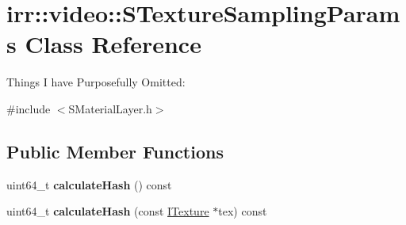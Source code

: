 \hypertarget{classirr_1_1video_1_1STextureSamplingParams}{}\section{irr\+:\+:video\+:\+:S\+Texture\+Sampling\+Params Class Reference}
\label{classirr_1_1video_1_1STextureSamplingParams}


Things I have Purposefully Omitted\+:  




{\ttfamily \#include $<$S\+Material\+Layer.\+h$>$}

\subsection*{Public Member Functions}
\begin{DoxyCompactItemize}
\item 
uint64\+\_\+t {\bfseries calculate\+Hash} () const \hypertarget{classirr_1_1video_1_1STextureSamplingParams_addbba653a10412ca9eb7f40dd8938d7f}{}\label{classirr_1_1video_1_1STextureSamplingParams_addbba653a10412ca9eb7f40dd8938d7f}

\item 
uint64\+\_\+t {\bfseries calculate\+Hash} (const \hyperlink{classirr_1_1video_1_1ITexture}{I\+Texture} $\ast$tex) const \hypertarget{classirr_1_1video_1_1STextureSamplingParams_af3ffc0d9eb5d95ca6e928f392875547c}{}\label{classirr_1_1video_1_1STextureSamplingParams_af3ffc0d9eb5d95ca6e928f392875547c}

\end{DoxyCompactItemize}
